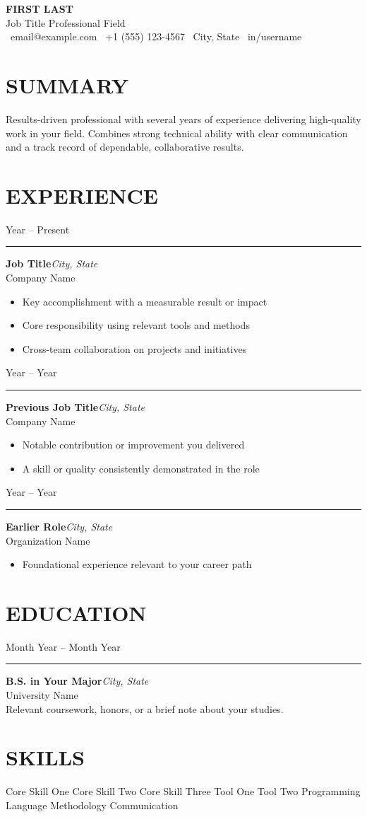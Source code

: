 \documentclass[10pt, letterpaper]{article}
\newcommand{\tlentry}[5]{%
    \noindent
    \begin{minipage}[t]{0.15\textwidth}\raggedleft\small\color{gray!75} #1\end{minipage}%
    \hspace{6pt}%
    \begin{minipage}[t]{0.02\textwidth}{\color{accent}\rule[0.2ex]{6pt}{6pt}}\end{minipage}%
    \hspace{8pt}%
    \begin{minipage}[t]{0.70\textwidth}%
        {\bfseries #2}\hfill{\small\itshape #4}\\
        {\color{accent}#3}\\[2pt]
        #5
    \end{minipage}%
    \par\vspace{8pt}
}
\begin{document}
{\setlength{\fboxsep}{12pt}%
\noindent\colorbox{accent}{%
\begin{minipage}{\dimexpr\textwidth-2\fboxsep\relax}
    \centering\color{white}
    {\fontsize{25}{29}\bfseries FIRST LAST}\\[3pt]
    {\large Job Title \textbullet{} Professional Field}\\[5pt]
    {\small
    \faEnvelope~email@example.com \quad
    \faPhone~+1 (555) 123-4567 \quad
    \faMapMarker*~City, State \quad
    \faLinkedin~in/username}
\end{minipage}}}

\section{SUMMARY}
Results-driven professional with several years of experience delivering high-quality work in your field. Combines strong technical ability with clear communication and a track record of dependable, collaborative results.

\section{EXPERIENCE}
\tlentry{Year -- Present}{Job Title}{Company Name}{City, State}{%
\begin{itemize}
    \item Key accomplishment with a measurable result or impact
    \item Core responsibility using relevant tools and methods
    \item Cross-team collaboration on projects and initiatives
\end{itemize}}
\tlentry{Year -- Year}{Previous Job Title}{Company Name}{City, State}{%
\begin{itemize}
    \item Notable contribution or improvement you delivered
    \item A skill or quality consistently demonstrated in the role
\end{itemize}}
\tlentry{Year -- Year}{Earlier Role}{Organization Name}{City, State}{%
\begin{itemize}
    \item Foundational experience relevant to your career path
\end{itemize}}

\section{EDUCATION}
\tlentry{Month Year -- Month Year}{B.S. in Your Major}{University Name}{City, State}{%
Relevant coursework, honors, or a brief note about your studies.}

\section{SKILLS}
Core Skill One \textbullet{} Core Skill Two \textbullet{} Core Skill Three \textbullet{} Tool One \textbullet{} Tool Two \textbullet{} Programming Language \textbullet{} Methodology \textbullet{} Communication
\end{document}
